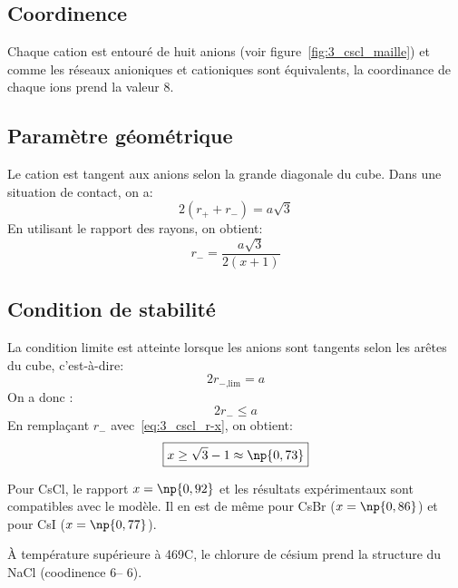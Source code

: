 \subsection{Coordinence}
Chaque cation est entouré de huit anions (voir figure~\ref{fig:3_cscl_maille})
et comme les réseaux anioniques et cationiques sont équivalents, la coordinance
de chaque ions prend la valeur 8.


\subsection{Paramètre géométrique}
Le cation est tangent aux anions selon la grande diagonale du cube. Dans une
situation de contact, on a:
\begin{equation}
    2(r_+ + r_-) = a\sqrt{3}
    \label{eq:3_cscl_ar+r-}
\end{equation}
En utilisant le rapport des rayons, on obtient:
\begin{equation}
    r_- = \frac{a\sqrt{3}}{2(x + 1)}
    \label{eq:3_cscl_r-x}
\end{equation}


\subsection{Condition de stabilité}
La condition limite est atteinte lorsque les anions sont tangents selon les arêtes
du cube, c'est-à-dire:
\begin{equation}
    2r_{-\text{,lim}} = a
\end{equation}
On a donc :
\begin{equation}
    2r_- \leq a
\end{equation}
En remplaçant $r_-$ avec~\ref{eq:3_cscl_r-x}, on obtient:
\begin{equation}
    \boxed{x \geq \sqrt{3} - 1 \approx \np{0,73}}
\end{equation}

\begin{rem}
    Pour CsCl, le rapport $x = \np{0,92}$ et les résultats 
    expérimentaux sont 
    compatibles avec le modèle. Il en est de même pour CsBr 
    ($x = \np{0,86}$) et pour CsI ($x = \np{0,77}$).
\end{rem}
\begin{rem}
    \`A température supérieure à 469\degre C, le chlorure de césium 
    prend la structure du NaCl (coodinence 6\--- 6).
\end{rem}



